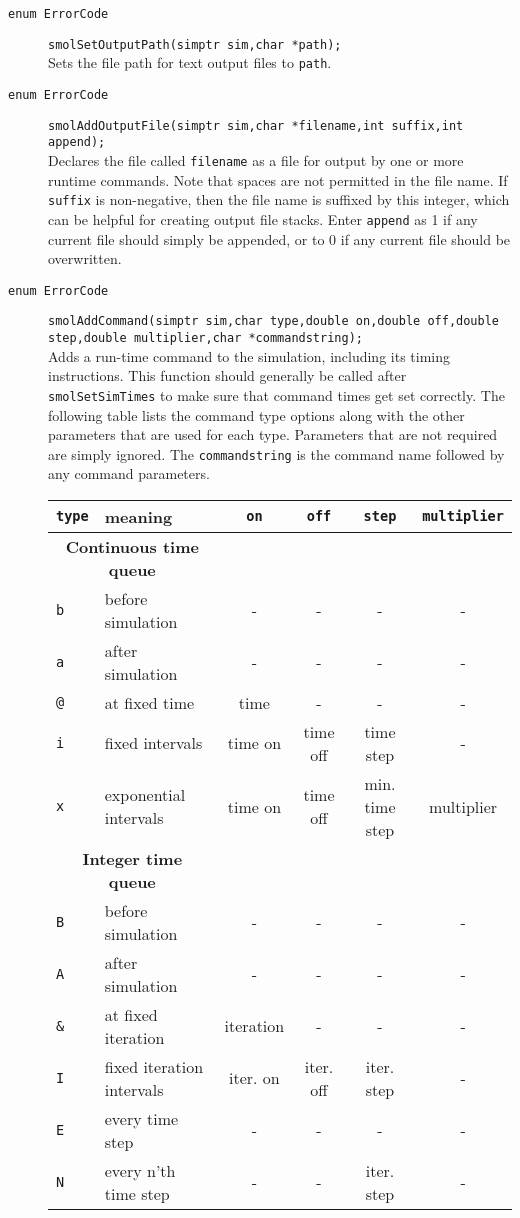 \documentclass {book}
\begin{document}
\begin{description}

\item[\texttt{enum ErrorCode}]
\texttt{smolSetOutputPath(simptr sim,char *path);}
\hfill \\
Sets the file path for text output files to \texttt{path}.

\item[\texttt{enum ErrorCode}]
\texttt{smolAddOutputFile(simptr sim,char *filename,int suffix,int append);}
\hfill \\
Declares the file called \texttt{filename} as a file for output by one or more runtime commands. Note that spaces are not permitted in the file name. If \texttt{suffix} is non-negative, then the file name is suffixed by this integer, which can be helpful for creating output file stacks. Enter \texttt{append} as 1 if any current file should simply be appended, or to 0 if any current file should be overwritten.

\item[\texttt{enum ErrorCode}]
\texttt{smolAddCommand(simptr sim,char type,double on,double off,double step,double multiplier,char *commandstring);}
\hfill \\
Adds a run-time command to the simulation, including its timing instructions. This function should generally be called after \texttt{smolSetSimTimes} to make sure that command times get set correctly. The following table lists the command type options along with the other parameters that are used for each type. Parameters that are not required are simply ignored. The \texttt{commandstring} is the command name followed by any command parameters.

\begin{longtable}[c]{ll|cccc}
\texttt{type} & meaning & \texttt{on} & \texttt{off} & \texttt{step} & \texttt{multiplier}\\
\hline
\multicolumn{2}{c}{\textbf{Continuous time queue}}\\
\texttt{b} & before simulation & - & - & - & -\\
\texttt{a} & after simulation & - & - & - & -\\
\texttt{@} & at fixed time & time & - & - & -\\
\texttt{i} & fixed intervals & time on & time off & time step & -\\
\texttt{x} & exponential intervals & time on & time off & min. time step & multiplier\\
\hline
\multicolumn{2}{c}{\textbf{Integer time queue}}\\
\texttt{B} & before simulation & - & - & - & -\\
\texttt{A} & after simulation & - & - & - & -\\
\texttt{\&} & at fixed iteration & iteration & - & - & -\\
\texttt{I} & fixed iteration intervals & iter. on & iter. off & iter. step & -\\
\texttt{E} & every time step & - & - & - & -\\
\texttt{N} & every n'th time step & - & - & iter. step & -\\
\end{longtable}


\end{description}
\end{document}
